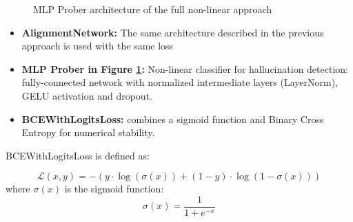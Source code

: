\begin{figure}[t]
{%
}
    \caption{MLP Prober architecture of the full non-linear approach}
    \label{fig:mlp-prober-architecture-full}
\end{figure}

\begin{itemize}
\item \textbf{AlignmentNetwork:} The same architecture described in the previous approach is used with the same loss
\item \textbf{MLP Prober in Figure \ref{fig:mlp-prober-architecture-full}:} Non-linear classifier for hallucination detection: fully-connected network with normalized intermediate layers (LayerNorm), GELU activation and dropout.
\item \textbf{BCEWithLogitsLoss:} combines a sigmoid function and Binary Cross Entropy for numerical stability.
\end{itemize}

BCEWithLogitsLoss is defined as:

\begin{equation}
\label{eq:cross_entropy}
\mathcal{L}(x, y) = - \left( y \cdot \log(\sigma(x)) + (1 - y) \cdot \log(1 - \sigma(x)) \right)
\end{equation}
where $\sigma(x)$ is the sigmoid function:
\begin{equation}
\label{eq:sigmoid}
\sigma(x) = \frac{1}{1 + e^{-x}}
\end{equation}


